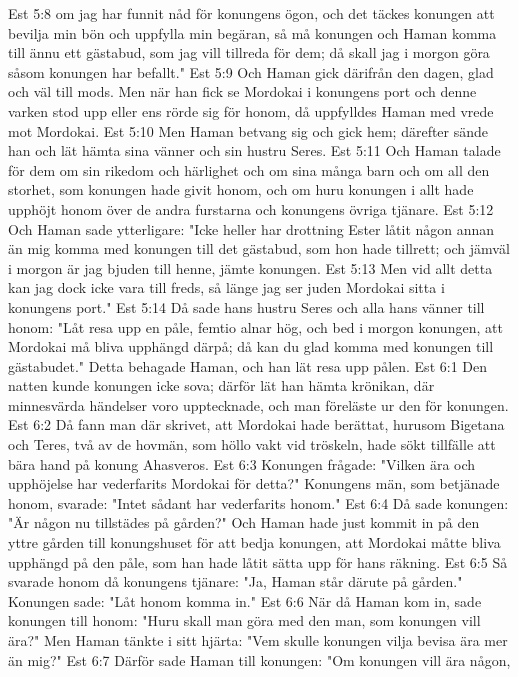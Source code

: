 Est 5:8  om jag har funnit nåd för konungens ögon, och det täckes konungen att bevilja min bön och uppfylla min begäran, så må konungen och Haman komma till ännu ett gästabud, som jag vill tillreda för dem; då skall jag i morgon göra såsom konungen har befallt."
Est 5:9  Och Haman gick därifrån den dagen, glad och väl till mods. Men när han fick se Mordokai i konungens port och denne varken stod upp eller ens rörde sig för honom, då uppfylldes Haman med vrede mot Mordokai.
Est 5:10  Men Haman betvang sig och gick hem; därefter sände han och lät hämta sina vänner och sin hustru Seres.
Est 5:11  Och Haman talade för dem om sin rikedom och härlighet och om sina många barn och om all den storhet, som konungen hade givit honom, och om huru konungen i allt hade upphöjt honom över de andra furstarna och konungens övriga tjänare.
Est 5:12  Och Haman sade ytterligare: "Icke heller har drottning Ester låtit någon annan än mig komma med konungen till det gästabud, som hon hade tillrett; och jämväl i morgon är jag bjuden till henne, jämte konungen.
Est 5:13  Men vid allt detta kan jag dock icke vara till freds, så länge jag ser juden Mordokai sitta i konungens port."
Est 5:14  Då sade hans hustru Seres och alla hans vänner till honom: "Låt resa upp en påle, femtio alnar hög, och bed i morgon konungen, att Mordokai må bliva upphängd därpå; då kan du glad komma med konungen till gästabudet." Detta behagade Haman, och han lät resa upp pålen.
Est 6:1  Den natten kunde konungen icke sova; därför lät han hämta krönikan, där minnesvärda händelser voro upptecknade, och man föreläste ur den för konungen.
Est 6:2  Då fann man där skrivet, att Mordokai hade berättat, hurusom Bigetana och Teres, två av de hovmän, som höllo vakt vid tröskeln, hade sökt tillfälle att bära hand på konung Ahasveros.
Est 6:3  Konungen frågade: "Vilken ära och upphöjelse har vederfarits Mordokai för detta?" Konungens män, som betjänade honom, svarade: "Intet sådant har vederfarits honom."
Est 6:4  Då sade konungen: "Är någon nu tillstädes på gården?" Och Haman hade just kommit in på den yttre gården till konungshuset för att bedja konungen, att Mordokai måtte bliva upphängd på den påle, som han hade låtit sätta upp för hans räkning.
Est 6:5  Så svarade honom då konungens tjänare: "Ja, Haman står därute på gården." Konungen sade: "Låt honom komma in."
Est 6:6  När då Haman kom in, sade konungen till honom: "Huru skall man göra med den man, som konungen vill ära?" Men Haman tänkte i sitt hjärta: "Vem skulle konungen vilja bevisa ära mer än mig?"
Est 6:7  Därför sade Haman till konungen: "Om konungen vill ära någon,
